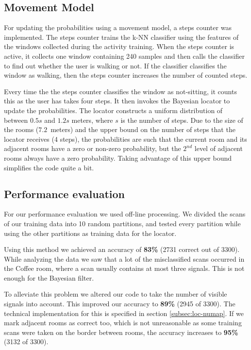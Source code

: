 \documentclass[a4paper,10pt,twoside]{IEEEtran}
\begin{document}
\subsection{Movement Model}
\label{sec:loc-movement-model}
For updating the probabilities using a movement model, a steps counter was implemented. The steps counter trains the k-NN classifier using the features of the windows collected during the activity training. When the steps counter is active, it collects one window containing 240 samples and then calls the classifier to find out whether the user is walking or not. If the classifier classifies the window as walking, then the steps counter increases the number of counted steps.

Every time the the steps counter classifies the window as not-sitting, it counts this as the user has takes four steps. It then invokes the Bayesian locator to update the probabilities. The locator constructs a uniform distribution of between $0.5s$ and $1.2s$ meters, where $s$ is the number of steps. Due to the size of the rooms ($7.2$~meters) and the upper bound on the number of steps that the locator receives (4 steps), the probabilities are such that the current room and its adjacent rooms have a zero or non-zero probability, but the $2^{nd}$ level of adjacent rooms always have a zero probability. Taking advantage of this upper bound simplifies the code quite a bit.

\subsection{Performance evaluation}
\label{sec:loc-evaluation}

For our performance evaluation we used off-line processing. We divided the scans of our training data into 10 random partitions, and tested every partition while using the other partitions as training data for the locator.

Using this method we achieved an accuracy of \textbf{83\%} (2731 correct out of 3300).
While analyzing the data we saw that a lot of the misclassified scans occurred in the Coffee room,
where a scan usually contains at most three signals. This is not enough for the Bayesian filter.

To alleviate this problem we altered our code to take the number of visible signals into account.
This improved our accuracy to \textbf{89\%} (2945 of 3300).
The technical implementation for this is specified in section \ref{subsec:loc-numap}.
If we mark adjacent rooms as correct too, which is not unreasonable as some training scans were taken on the border between rooms, the accuracy increases to \textbf{95\%} (3132 of 3300).
\end{document}
